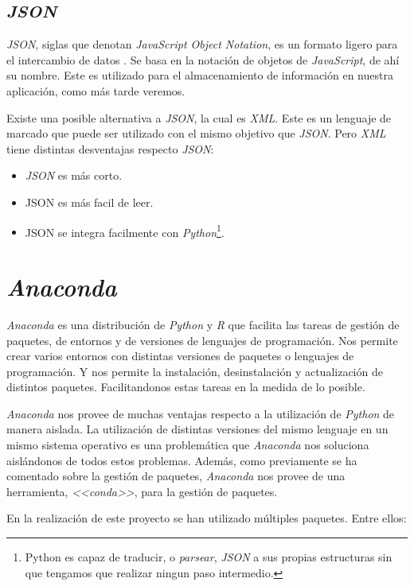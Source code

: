 \subsection{\textit{JSON}}
\textit{JSON}, siglas que denotan \textit{JavaScript Object Notation}, es un formato ligero para el intercambio de datos \cite{json}. Se basa en la notación de objetos de \textit{JavaScript}, de ahí su nombre. Este es utilizado para el almacenamiento de información en nuestra aplicación, como más tarde veremos.

Existe una posible alternativa a \textit{JSON}, la cual es \textit{XML}. Este es un lenguaje de marcado que puede ser utilizado con el mismo objetivo que \textit{JSON}. Pero \textit{XML} tiene distintas desventajas respecto \textit{JSON}:

\begin{itemize}
	\item \textit{JSON} es más corto.
	\item JSON es más facil de leer.
	\item JSON se integra facilmente con \textit{Python}\footnote{Python es capaz de traducir, o \textit{parsear}, \textit{JSON} a sus propias estructuras sin que tengamos que realizar ningun paso intermedio.}.
\end{itemize}
\section{\textit{Anaconda}}

\textit{Anaconda} es una distribución de \textit{Python} y \textit{R} que facilita las tareas de gestión de paquetes, de entornos y de versiones de lenguajes de programación. Nos permite crear varios entornos con distintas versiones de paquetes o lenguajes de programación. Y nos permite la instalación, desinstalación y actualización de distintos paquetes. Facilitandonos estas tareas en la medida de lo posible.
 
\textit{Anaconda} nos provee de muchas ventajas respecto a la utilización de \textit{Python} de manera aislada. La utilización de distintas versiones del mismo lenguaje en un mismo sistema operativo es una problemática que \textit{Anaconda} nos soluciona aislándonos de todos estos problemas. Además, como previamente se ha comentado sobre la gestión de paquetes, \textit{Anaconda} nos provee de una herramienta, \textit{<<conda>>}, para la gestión de paquetes.

En la realización de este proyecto se han utilizado múltiples paquetes. Entre ellos: 


